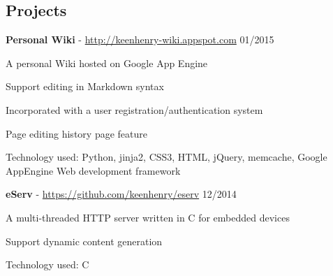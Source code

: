 \documentclass[margin,line]{resume}
\begin{document}
\begin{resume}
    \section{\mysidestyle Projects}


    \textbf{Personal Wiki} - \url{http://keenhenry-wiki.appspot.com} \hfill 01/2015 \vspace{-3mm}\\\vspace{-1mm}%
      \begin{list2}
       \item A personal Wiki hosted on Google App Engine
       \item Support editing in Markdown syntax
       \item Incorporated with a user registration/authentication system
       \item Page editing history page feature
       \item Technology used: Python, jinja2, CSS3, HTML, jQuery, memcache, Google AppEngine Web development framework
      \end{list2}

    \textbf{eServ} - \url{https://github.com/keenhenry/eserv} \hfill 12/2014 \vspace{-3mm}\\\vspace{-1mm}%
      \begin{list2}
       \item A multi-threaded HTTP server written in C for embedded devices
       \item Support dynamic content generation
       \item Technology used: C%
      \end{list2}


\end{resume}
\end{document}
